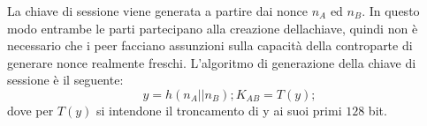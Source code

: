 	La chiave di sessione viene generata a partire dai nonce $n_A$ ed $n_B$. In questo modo entrambe le parti partecipano
	alla creazione dellachiave, quindi non è necessario che i peer facciano assunzioni sulla capacità
	della controparte di generare nonce realmente freschi.
	L'algoritmo di generazione della chiave di sessione è il seguente:
	\[
 		y = h ( n_A || n_B ) ;
		K_{AB} =  T(y) ;
	\]
	dove per $T(y)$ si intendone il troncamento di y ai suoi primi $128$ bit.
